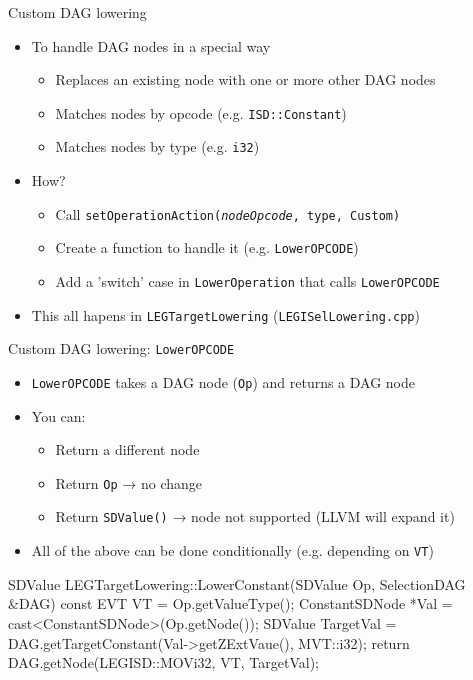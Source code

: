 \begin{frame}[fragile]{Custom DAG lowering}

\begin{itemize}
    \item To handle DAG nodes in a special way
    \begin{itemize}
        \item Replaces an existing node with one or more other DAG nodes
        \item Matches nodes by opcode (e.g. \texttt{ISD::Constant})
        \item Matches nodes by type (e.g. \texttt{i32})
    \end{itemize}
    \item How?
    \begin{itemize}
        \item Call \texttt{setOperationAction(\emph{nodeOpcode}, type, Custom)}
        \item Create a function to handle it (e.g. \texttt{LowerOPCODE})
        \item Add a 'switch' case in \texttt{LowerOperation} that calls \texttt{LowerOPCODE}
    \end{itemize}
    \item This all hapens in \texttt{LEGTargetLowering} (\texttt{LEGISelLowering.cpp})
\end{itemize}

\end{frame}


\begin{frame}[fragile]{Custom DAG lowering: \texttt{LowerOPCODE}}

\begin{itemize}
    \item \texttt{LowerOPCODE} takes a DAG node (\texttt{Op}) and returns a DAG node
    \item You can:
    \begin{itemize}
        \item Return a different node
        \item Return \texttt{Op} → no change
        \item Return \texttt{SDValue()} → node not supported (LLVM will expand it)
    \end{itemize}
    \item All of the above can be done conditionally (e.g. depending on \texttt{VT})
\end{itemize}

\begin{codebox}
SDValue LEGTargetLowering::LowerConstant(SDValue Op,
                                         SelectionDAG &DAG) const {
  EVT VT = Op.getValueType();
  ConstantSDNode *Val = cast<ConstantSDNode>(Op.getNode());
  SDValue TargetVal = DAG.getTargetConstant(Val->getZExtVaue(),
                                            MVT::i32);
  return DAG.getNode(LEGISD::MOVi32, VT, TargetVal);
}
\end{codebox}

\end{frame}


